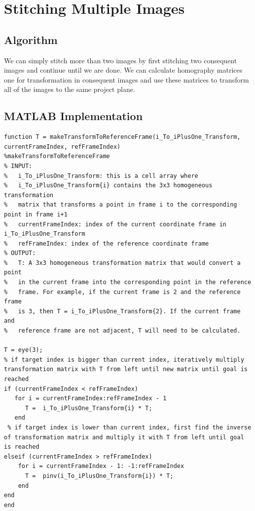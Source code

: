 \documentclass{article}
\begin{document}
\section{Stitching Multiple Images}

\subsection{Algorithm}
We can simply stitch more than two images by first stitching two consequent images and continue until we are done. We can calculate homography matrices one for transformation in consequent images and use these matrices to transform all of the images to the same project plane.
\subsection{MATLAB Implementation}
\begin{lstlisting}[caption={My implementation of makeTransformToReferenceFrame function.},captionpos=b]
function T = makeTransformToReferenceFrame(i_To_iPlusOne_Transform, currentFrameIndex, refFrameIndex)
%makeTransformToReferenceFrame
% INPUT:
%   i_To_iPlusOne_Transform: this is a cell array where
%   i_To_iPlusOne_Transform{i} contains the 3x3 homogeneous transformation
%   matrix that transforms a point in frame i to the corresponding point in frame i+1
%   currentFrameIndex: index of the current coordinate frame in i_To_iPlusOne_Transform
%   refFrameIndex: index of the reference coordinate frame
% OUTPUT:
%   T: A 3x3 homogeneous transformation matrix that would convert a point
%   in the current frame into the corresponding point in the reference
%   frame. For example, if the current frame is 2 and the reference frame
%   is 3, then T = i_To_iPlusOne_Transform{2}. If the current frame and
%   reference frame are not adjacent, T will need to be calculated.

T = eye(3);
% if target index is bigger than current index, iteratively multiply transformation matrix with T from left until new matrix until goal is reached 
if (currentFrameIndex < refFrameIndex)
   for i = currentFrameIndex:refFrameIndex - 1
      T =  i_To_iPlusOne_Transform{i} * T;
   end
 % if target index is lower than current index, first find the inverse of transformation matrix and multiply it with T from left until goal is reached
elseif (currentFrameIndex > refFrameIndex)
    for i = currentFrameIndex - 1: -1:refFrameIndex
      T =  pinv(i_To_iPlusOne_Transform{i}) * T;
    end
end
end
\end{lstlisting}
\end{document}
